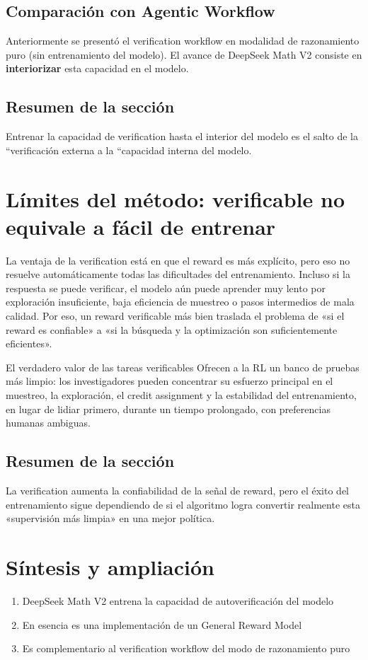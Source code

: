 \documentclass[a4paper]{article}
\begin{document}
\subsection{Comparación con Agentic Workflow}
Anteriormente se presentó el verification workflow en modalidad de razonamiento puro (sin entrenamiento del modelo). El avance de DeepSeek Math V2 consiste en \textbf{interiorizar} esta capacidad en el modelo.

\subsection{Resumen de la sección}
Entrenar la capacidad de verification hasta el interior del modelo es el salto de la ``verificación externa a la ``capacidad interna del modelo.

\newpage
\section{Límites del método: verificable no equivale a fácil de entrenar}
La ventaja de la verification está en que el reward es más explícito, pero eso no resuelve automáticamente todas las dificultades del entrenamiento. Incluso si la respuesta se puede verificar, el modelo aún puede aprender muy lento por exploración insuficiente, baja eficiencia de muestreo o pasos intermedios de mala calidad. Por eso, un reward verificable más bien traslada el problema de «si el reward es confiable» a «si la búsqueda y la optimización son suficientemente eficientes».

\begin{importantbox}{El verdadero valor de las tareas verificables}
Ofrecen a la RL un banco de pruebas más limpio: los investigadores pueden concentrar su esfuerzo principal en el muestreo, la exploración, el credit assignment y la estabilidad del entrenamiento, en lugar de lidiar primero, durante un tiempo prolongado, con preferencias humanas ambiguas.
\end{importantbox}

\subsection{Resumen de la sección}
La verification aumenta la confiabilidad de la señal de reward, pero el éxito del entrenamiento sigue dependiendo de si el algoritmo logra convertir realmente esta «supervisión más limpia» en una mejor política.

\newpage
\section{Síntesis y ampliación}
\begin{enumerate}
  \item DeepSeek Math V2 entrena la capacidad de autoverificación del modelo
  \item En esencia es una implementación de un General Reward Model
  \item Es complementario al verification workflow del modo de razonamiento puro
\end{enumerate}
\end{document}
